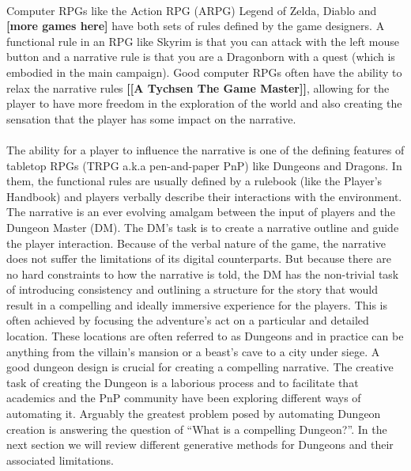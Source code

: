 \documentclass{UoYCSproject}
\begin{document}
\paragraph{}
Computer RPGs like the Action RPG (ARPG) Legend of Zelda, Diablo and \textbf{[more games here]} have both sets of rules defined by the game designers. A functional rule in an RPG like Skyrim is that you can attack with the left mouse button and a narrative rule is that you are a Dragonborn with a quest (which is embodied in the main campaign). Good computer RPGs often have the ability to relax the narrative rules \textbf{[[A Tychsen The Game Master]]}, allowing for the player to have more freedom in the exploration of the world and also creating the sensation that the player has some impact on the narrative.

\paragraph{}
The ability for a player to influence the narrative is one of the defining features of tabletop RPGs (TRPG a.k.a pen-and-paper PnP) like Dungeons and Dragons. In them, the functional rules are usually defined by a rulebook (like the Player’s Handbook) and players verbally describe their interactions with the environment. The narrative is an ever evolving amalgam between the input of players and the Dungeon Master (DM). The DM’s task is to create a narrative outline and guide the player interaction. Because of the verbal nature of the game, the narrative does not suffer the limitations of its digital counterparts. But because there are no hard constraints to how the narrative is told, the DM has the non-trivial task of introducing consistency and outlining a structure for the story that would result in a compelling and ideally immersive experience for the players. This is often achieved by focusing the adventure’s act on a particular and detailed location. These locations are often referred to as Dungeons and in practice can be anything from the villain's mansion or a beast’s cave to a city under siege. A good dungeon design is crucial for creating a compelling narrative. The creative task of creating the Dungeon is a laborious process and to facilitate that academics and the PnP community have been exploring different ways of automating it. Arguably the greatest problem posed by automating Dungeon creation is answering the question of “What is a compelling Dungeon?”. In the next section we will review different generative methods for Dungeons and their associated limitations.
\end{document}
